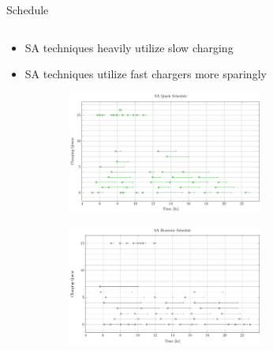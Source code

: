 \documentclass[aspectratio=169]{beamer}
\begin{document}
\begin{frame}[label={sec:org749d91b}]{Schedule}
\begin{columns}
\begin{column}{0.5\columnwidth}
{\scriptsize
\begin{itemize}
\item SA techniques heavily utilize slow charging
\item SA techniques utilize fast chargers more sparingly
\end{itemize}
}

\begin{figure}
\begin{subfigure}[t]{\textwidth}
\centering
    \includegraphics[width=0.7\textwidth]{img/sa-pap-paper-good/schedule-sa-quick}
\end{subfigure}
\begin{subfigure}[t]{\textwidth}
\centering
    \includegraphics[width=0.7\textwidth]{img/sa-pap-paper-good/schedule-sa-heuristic}
\end{subfigure}
\end{figure}
\end{column}
\end{columns}
\end{frame}
\end{document}
